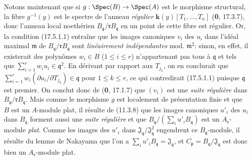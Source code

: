 Notons maintenant que si $g:\Spec(B)\to\Spec(A)$ est le morphisme structural, la fibre $g^{-1}(y)$ est le spectre de l'anneau \emph{régulier} $\boldsymbol{k}(y)[T_1,\ldots,T_n]$ (\textbf{0}, 17.3.7), donc l'anneau local noethérien $B_{\mathfrak q}/\mathfrak rB_{\mathfrak q}$ en un point de cette fibre est régulier. Or, la condition (17.5.1.1) entraîne que les images canoniques $v_i$ des $u_i$ dans l'idéal maximal $\mathfrak m$ de $B_{\mathfrak q}/\mathfrak rB_{\mathfrak q}$ sont \emph{linéairement indépendantes} mod. $\mathfrak m^2$: sinon, en effet, il existerait des polynômes $w_i\in B$ ($1\leq i\leq r$) n'appartenant pas tous à $\mathfrak q$ et tels que $\sum_{i=1}^r w_i u_i\in\mathfrak q^2$. En dérivant par rapport aux $T_{j_k}$, on en conclurait que $\sum_{i=1}^r w_i(\partial u_i/\partial T_{j_k})\in\mathfrak q$ pour $1\leq k\leq r$, ce qui contredirait (17.5.1.1) puisque $\mathfrak q$ est premier. On conclut donc de (\textbf{0}, 17.1.7) que $(v_i)$ est une \emph{suite régulière} dans $B_{\mathfrak q}/\mathfrak rB_{\mathfrak q}$. Mais comme le morphisme $g$ est localement de présentation finie et que $B$ est un $A$-module plat, il résulte de (11.3.8) que les images canoniques $u'_i$ des $u_i$ dans $B_{\mathfrak q}$ forment aussi une \emph{suite régulière} et que $B_{\mathfrak q}/(\sum_i u'_iB_{\mathfrak q})$ est un $A_{\mathfrak r}$-module \emph{plat}. Comme les images des $u'_i$ dans $\mathfrak J_{\mathfrak q}/\mathfrak J_{\mathfrak q}^2$ engendrent ce $B_{\mathfrak q}$-module, il résulte du lemme de Nakayama que l'on a $\sum_i u'_iB_{\mathfrak q}=\mathfrak J_{\mathfrak q}$, et $C_{\mathfrak p}=B_{\mathfrak q}/\mathfrak J_{\mathfrak q}$ est donc bien un $A_{\mathfrak r}$-module plat.

